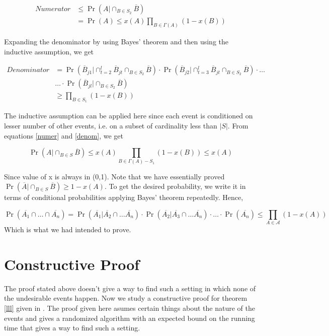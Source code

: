 \begin{equation}
\begin{split}
 Numerator & \leq \Pr\left(A|\cap_{B\in S_{2}} \overline{B}\right) \\
 & = \Pr(A) \leq x(A) \prod\limits_{B\in\Gamma(A)}\left(1-x(B)\right)
 \label{numer}
\end{split}
\end{equation}



Expanding the denominator by using Bayes' theorem and then using the inductive assumption, we get

\begin{equation}
\begin{split}
\label{denom}
 Denominator &= \Pr\left(\overline{B}_{j1}|\cap_{t=2}^l \overline{B}_{jt}\cap_{B\in S_{2}} \overline{B} \right)\cdot \Pr\left(\overline{B}_{j2}|\cap_{t=3}^l\overline{B}_{jt}\cap_{B\in S_{2}} \overline{B} \right)\cdot \ldots \\
 &\ldots \cdot \Pr\left(\overline{B}_{jl}|\cap_{B\in S_{2}} \overline{B} \right) \\
 & \geq \prod\limits_{B\in S_{1}} \left(1-x(B)\right) 
\end{split}
\end{equation}


The inductive assumption can be applied here since each event is conditioned on lesser number of other events, i.e. on a subset of cardinality less than $|S|$. From equations \ref{numer} and \ref{denom}, we get

\[ 
\Pr\left(A|\cap_{B\in S} \overline{B}\right) \leq x(A)\prod\limits_{B\in \Gamma(A)-S_{1}}(1-x(B)) \leq x(A)  \]

Since value of x is always in (0,1). Note that we have essentially proved $ \Pr\left(\overline{A}|\cap_{B\in S} \overline{B}\right) \geq 1-x(A) $. To get the desired probability, we write it in terms of conditional probabilities applying Bayes' theorem repeatedly. Hence,

\[ 
\Pr\left(\overline{A_1} \cap \ldots \cap \overline{A_n} \right) = \Pr\left(\overline{A_1}|\overline{A_{2}}\cap \ldots \overline{A_{n}}\right)\cdot\Pr\left(\overline{A_2}|\overline{A_{3}}\cap \ldots \overline{A_{n}}\right)\cdot \ldots \cdot \Pr\left(\overline{A_{n}}\right) \leq \prod\limits_{A\in\mathcal{A}}(1-x(A)) 
\]
Which is what we had intended to prove.

\section{Constructive Proof}
The proof stated above doesn't give a way to find such a setting in which none of the undesirable events happen. Now
we study a constructive proof for theorem \ref{lll} given in \cite{constructive}. The proof given here asumes certain things about the nature of the events and gives a randomized algorithm with an expected bound on the running time that gives a way to find such a setting.
